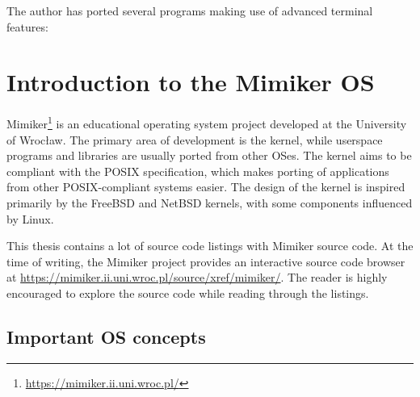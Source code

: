 \documentclass[shortabstract, manyadvisors, english, mgr]{iithesis}
\begin{document}
The author has ported several programs making use of advanced terminal features:

\section{Introduction to the Mimiker OS}

Mimiker\footnote{\url{https://mimiker.ii.uni.wroc.pl/}} is an educational
operating system project developed at the University of Wrocław. The primary
area of development is the kernel, while userspace programs and libraries are
usually ported from other OSes. The kernel aims to be compliant with the POSIX
specification, which makes porting of applications from other POSIX-compliant
systems easier. The design of the kernel is inspired primarily by the FreeBSD
and NetBSD kernels, with some components influenced by Linux.

This thesis contains a lot of source code listings with Mimiker source code. At
the time of writing, the Mimiker project provides an interactive source code
browser at \url{https://mimiker.ii.uni.wroc.pl/source/xref/mimiker/}. The reader
is highly encouraged to explore the source code while reading through the
listings.

\subsection{Important OS concepts}
\end{document}
